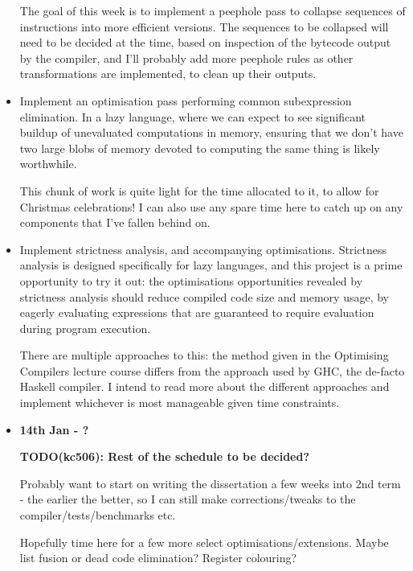 \documentclass[12pt]{article}
\newcommand\todo[1]{\textbf{TODO(kc506): #1}}
\begin{document}
\begin{itemize}
{    The goal of this week is to implement a peephole pass to collapse sequences of instructions into more efficient
    versions. The sequences to be collapsed will need to be decided at the time, based on inspection of the bytecode
    output by the compiler, and I'll probably add more peephole rules as other transformations are implemented, to clean
    up their outputs.

}
\item
{

    Implement an optimisation pass performing common subexpression elimination. In a lazy language, where we can expect
    to see significant buildup of unevaluated computations in memory, ensuring that we don't have two large blobs of
    memory devoted to computing the same thing is likely worthwhile.

    This chunk of work is quite light for the time allocated to it, to allow for Christmas celebrations! I can also use
    any spare time here to catch up on any components that I've fallen behind on.

}
\item
{

    Implement strictness analysis, and accompanying optimisations. Strictness analysis is designed specifically for lazy
    languages, and this project is a prime opportunity to try it out: the optimisations opportunities revealed by
    strictness analysis should reduce compiled code size and memory usage, by eagerly evaluating expressions that are
    guaranteed to require evaluation during program execution.

    There are multiple approaches to this: the method given in the Optimising Compilers lecture course differs from the
    approach used by GHC, the de-facto Haskell compiler. I intend to read more about the different approaches and
    implement whichever is most manageable given time constraints.

}
\item
{
    \textbf{14th Jan - ?}

    \todo{Rest of the schedule to be decided?}

    Probably want to start on writing the dissertation a few weeks into 2nd term - the earlier the better, so I can
    still make corrections/tweaks to the compiler/tests/benchmarks etc.

    Hopefully time here for a few more select optimisations/extensions. Maybe list fusion or dead code elimination?
    Register colouring?

}
\end{itemize}
\end{document}
